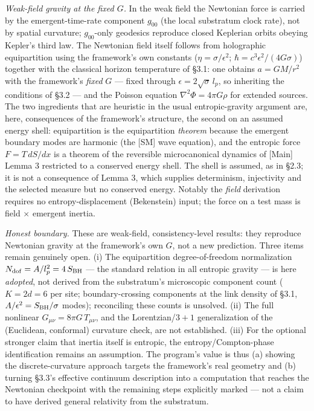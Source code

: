 \documentclass[
]{article}
\begin{document}
\emph{Weak-field gravity at the fixed \(G\).} In the weak field the
Newtonian force is carried by the emergent-time-rate component
\(g_{00}\) (the local substratum clock rate), not by spatial curvature;
\(g_{00}\)-only geodesics reproduce closed Keplerian orbits obeying
Kepler's third law. The Newtonian field itself follows from holographic
equipartition using the framework's own constants
(\(\eta = \sigma/\epsilon^2\); \(\hbar = c^3\epsilon^2/(4G\sigma)\))
together with the classical horizon temperature of §3.1: one obtains
\(a = GM/r^2\) with the framework's \emph{fixed} \(G\) --- fixed through
\(\epsilon = 2\sqrt{\sigma}\,l_p\), so inheriting the conditions of §3.2
--- and the Poisson equation \(\nabla^2\Phi = 4\pi G\rho\) for extended
sources. The two ingredients that are heuristic in the usual
entropic-gravity argument are, here, consequences of the framework's
structure, the second on an assumed energy shell: equipartition is the
equipartition \emph{theorem} because the emergent boundary modes are
harmonic (the {[}SM{]} wave equation), and the entropic force
\(F = T\,dS/dx\) is a theorem of the reversible microcanonical dynamics
of {[}Main{]} Lemma 3 restricted to a conserved energy shell. The shell
is assumed, as in §2.3; it is not a consequence of Lemma 3, which
supplies determinism, injectivity and the selected measure but no
conserved energy. Notably the \emph{field} derivation requires no
entropy-displacement (Bekenstein) input; the force on a test mass is
field \(\times\) emergent inertia.

\emph{Honest boundary.} These are weak-field, consistency-level results:
they reproduce Newtonian gravity at the framework's own \(G\), not a new
prediction. Three items remain genuinely open. (i) The equipartition
degree-of-freedom normalization
\(N_{\rm dof} = A/l_p^2 = 4\,S_{\rm BH}\) --- the standard relation in
all entropic gravity --- is here \emph{adopted}, not derived from the
substratum's microscopic component count (\(K = 2d = 6\) per site;
boundary-crossing components at the link density of §3.1,
\(A/\epsilon^2 = S_{\rm BH}/\sigma\) modes); reconciling these counts is
unsolved. (ii) The full nonlinear \(G_{\mu\nu} = 8\pi G\,T_{\mu\nu}\),
and the Lorentzian/\(3{+}1\) generalization of the (Euclidean,
conformal) curvature check, are not established. (iii) For the optional
stronger claim that inertia itself is entropic, the
entropy/Compton-phase identification remains an assumption. The
program's value is thus (a) showing the discrete-curvature approach
targets the framework's real geometry and (b) turning §3.3's effective
continuum description into a computation that reaches the Newtonian
checkpoint with the remaining steps explicitly marked --- not a claim to
have derived general relativity from the substratum.
\end{document}
